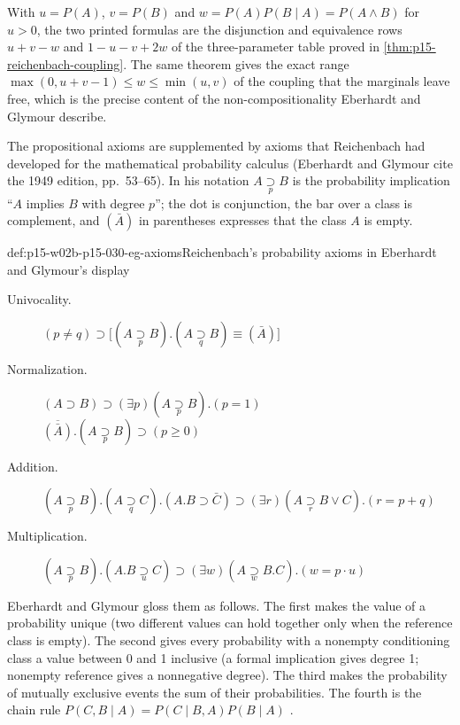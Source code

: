 With \(u=P(A)\), \(v=P(B)\) and \(w=P(A)P(B\mid A)=P(A\land B)\) for
\(u>0\), the two printed formulas are the disjunction and equivalence
rows \(u+v-w\) and \(1-u-v+2w\) of the three-parameter table proved in
\cref{thm:p15-reichenbach-coupling}. The same theorem gives the exact
range \(\max(0,u+v-1)\leq w\leq\min(u,v)\) of the coupling that the
marginals leave free, which is the precise content of the
non-compositionality Eberhardt and Glymour describe.

The propositional axioms are supplemented by axioms that Reichenbach had
developed for the mathematical probability calculus (Eberhardt and Glymour cite
the 1949 edition, pp.~53--65). In his notation
\(A\mathrel{\underset{p}{\supset}}B\) is the probability implication
``\(A\) implies \(B\) with degree \(p\)''; the dot is conjunction, the bar
over a class is complement, and \((\bar A)\) in parentheses expresses
that the class \(A\) is empty.

\begin{hbdefinition}{def:p15-w02b-p15-030-eg-axioms}{Reichenbach's probability axioms in Eberhardt and Glymour's display}
\begin{description}
\item[Univocality.]
\(\displaystyle (p\neq q)\supset\bigl[(A\mathrel{\underset{p}{\supset}}B).(A\mathrel{\underset{q}{\supset}}B)\equiv(\bar A)\bigr]\)
\item[Normalization.]
\(\displaystyle (A\supset B)\supset(\exists p)(A\mathrel{\underset{p}{\supset}}B).(p=1)\)\\
\(\displaystyle \overline{(\bar A)}.(A\mathrel{\underset{p}{\supset}}B)\supset(p\geq0)\)
\item[Addition.]
\(\displaystyle (A\mathrel{\underset{p}{\supset}}B).(A\mathrel{\underset{q}{\supset}}C).(A.B\supset\bar C)\supset(\exists r)(A\mathrel{\underset{r}{\supset}}B\lor C).(r=p+q)\)
\item[Multiplication.]
\(\displaystyle (A\mathrel{\underset{p}{\supset}}B).(A.B\mathrel{\underset{u}{\supset}}C)\supset(\exists w)(A\mathrel{\underset{w}{\supset}}B.C).(w=p\cdot u)\)
\end{description}
Eberhardt and Glymour gloss them as follows. The first makes the value of a
probability unique (two different values can hold together only when the
reference class is empty). The second gives every probability with a
nonempty conditioning class a value between 0 and 1 inclusive (a formal
implication gives degree 1; nonempty reference gives a nonnegative
degree). The third makes the probability of mutually exclusive events
the sum of their probabilities. The fourth is the chain rule
\(P(C,B\mid A)=P(C\mid B,A)P(B\mid A)\)
\cite[pp.~370--371]{EberhardtGlymour2011ReichenbachReading}.
\end{hbdefinition}

